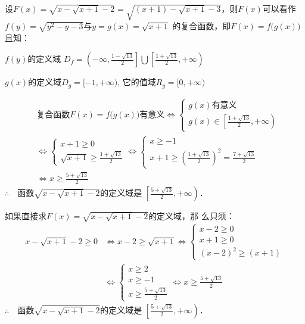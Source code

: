 \begin{solution}
设$F(x)=\sqrt{x-\sqrt{x+1}-2}=\sqrt{(x+1)-\sqrt{x+1}-3}$，则$F(x)$可以看作$f(y)=\sqrt{y^2-y-3}$与$y=g(x)=\sqrt{x+1}$
的复合函数，即$F(x)=f\big(g(x)\big)$且知：

$f(y)$的定义域
$D_f=\left(-\infty,\frac{1-\sqrt{13}}{2}\right]\bigcup\left[\frac{1+\sqrt{13}}{2},+\infty\right)$

$g(x)$的定义域$D_g=[-1,+\infty)$, 它的值域$R_g=[0,+\infty)$

\[\begin{split}
&\text{复合函数$F(x)=f\big(g(x)\big)$有意义}\Longleftrightarrow
\begin{cases}
    g(x)\text{有意义}\\
    g(x)\in\left[\frac{1+\sqrt{13}}{2},+\infty\right)
\end{cases}\\
&\Longleftrightarrow
\begin{cases}
    x+1\ge 0\\
    \sqrt{x+1}\ge \frac{1+\sqrt{13}}{2}
\end{cases}\Longleftrightarrow
\begin{cases}
    x\ge -1\\
    x+1\ge \left(\frac{1+\sqrt{13}}{2}\right)^2=\frac{7+\sqrt{13}}{2}
\end{cases}\\
&\Longleftrightarrow x\ge \frac{5+\sqrt{13}}{2}
\end{split}\]
$\therefore\quad $函数$\sqrt{x-\sqrt{x+1}-2}$的定义域是
$\left[\frac{5+\sqrt{13}}{2},+\infty\right)$．

如果直接求$F(x)=\sqrt{x-\sqrt{x+1}-2}$的定义域，那
么只须：
\[\begin{split}
   x-\sqrt{x+1}-2\ge 0& \Longleftrightarrow x-2\ge \sqrt{x+1} \Longleftrightarrow \begin{cases}
    x-2\ge 0\\ x+1\ge 0\\ (x-2)^2\ge (x+1)
\end{cases}\\
& \Longleftrightarrow \begin{cases}
    x\ge 2\\x\ge -1\\ x\ge \frac{5+\sqrt{13}}{2}
\end{cases} \Longleftrightarrow x\ge \frac{5+\sqrt{13}}{2}
\end{split}\]
$\therefore\quad $函数$\sqrt{x-\sqrt{x+1}-2}$的定义域是
$\left[\frac{5+\sqrt{13}}{2},+\infty\right)$．
\end{solution}

